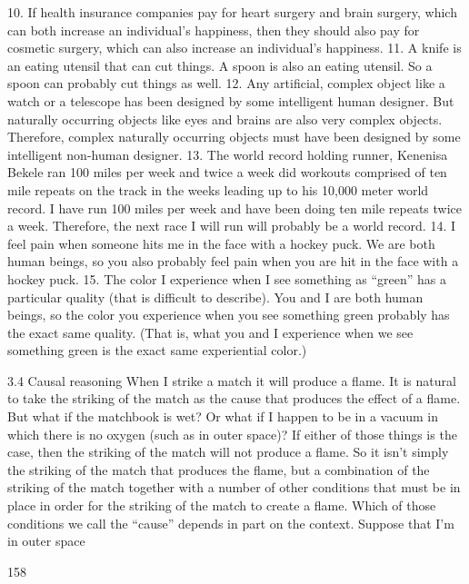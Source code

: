 10. If health insurance companies pay for heart surgery and brain surgery,
which can both increase an individual’s happiness, then they should
also pay for cosmetic surgery, which can also increase an individual’s
happiness.
11. A knife is an eating utensil that can cut things. A spoon is also an
eating utensil. So a spoon can probably cut things as well.
12. Any artificial, complex object like a watch or a telescope has been
designed by some intelligent human designer. But naturally occurring
objects like eyes and brains are also very complex objects. Therefore,
complex naturally occurring objects must have been designed by
some intelligent non-human designer.
13. The world record holding runner, Kenenisa Bekele ran 100 miles per
week and twice a week did workouts comprised of ten mile repeats on
the track in the weeks leading up to his 10,000 meter world record. I
have run 100 miles per week and have been doing ten mile repeats
twice a week. Therefore, the next race I will run will probably be a
world record.
14. I feel pain when someone hits me in the face with a hockey puck. We
are both human beings, so you also probably feel pain when you are
hit in the face with a hockey puck.
15. The color I experience when I see something as “green” has a
particular quality (that is difficult to describe). You and I are both
human beings, so the color you experience when you see something
green probably has the exact same quality. (That is, what you and I
experience when we see something green is the exact same
experiential color.)

3.4 Causal reasoning
When I strike a match it will produce a flame. It is natural to take the striking of
the match as the cause that produces the effect of a flame. But what if the
matchbook is wet? Or what if I happen to be in a vacuum in which there is no
oxygen (such as in outer space)? If either of those things is the case, then the
striking of the match will not produce a flame. So it isn’t simply the striking of
the match that produces the flame, but a combination of the striking of the
match together with a number of other conditions that must be in place in order
for the striking of the match to create a flame. Which of those conditions we call
the “cause” depends in part on the context. Suppose that I’m in outer space

158


